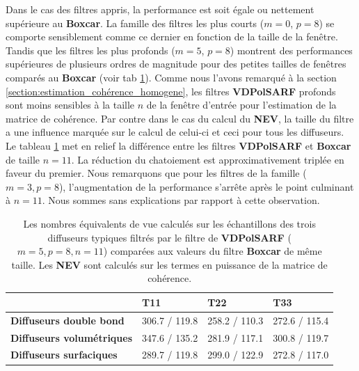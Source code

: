 Dans le cas des filtres appris, la performance est soit égale ou nettement supérieure au \textbf{Boxcar}. La famille des filtres les plus courts ($m=0$, $p=8$) se comporte sensiblement comme ce dernier en fonction de la taille de la fenêtre. Tandis que les filtres les plus profonds ($m=5$, $p=8$) montrent des performances supérieures de plusieurs ordres de magnitude pour des petites tailles de fenêtres comparés au \textbf{Boxcar} (voir tab \ref{tab:vdpolsarf_lee_nev}).  Comme nous l'avons remarqué à la section \ref{section:estimation_cohérence_homogene}, les filtres \textbf{VDPolSARF} profonds sont moins sensibles à la taille $n$ de la fenêtre d'entrée pour l'estimation de la matrice de cohérence.  Par contre dans le cas du calcul du \textbf{NEV}, la taille du filtre a une influence marquée sur le calcul de celui-ci et ceci pour tous les diffuseurs.  Le tableau \ref{tab:vdpolsarf_lee_nev} met en relief la différence entre les filtres \textbf{VDPolSARF} et \textbf{Boxcar} de taille $n=11$.  La réduction du chatoiement est approximativement triplée en faveur du premier. Nous remarquons que pour les filtres de la famille ($m=3, p=8$), l'augmentation de la performance s'arrête après le point culminant à $n=11$.  Nous sommes sans explications par rapport à cette observation.


\begin{table}[!htbp]
\centering
\begin{tabular}{|l|l|l|l|}
\hline
                     & \textbf{T11} & \textbf{T22} & \textbf{T33} \\ \hline
\textbf{Diffuseurs double bond} & 306.7 / 119.8      & 258.2 / 110.3        & 272.6 / 115.4        \\ \hline 
\textbf{Diffuseurs volumétriques}      & 347.6  / 135.2         & 281.9  / 117.1       & 300.8 / 119.7        \\ \hline
\textbf{Diffuseurs surfaciques}     & 289.7 / 119.8        & 299.0 / 122.9        & 272.8 / 117.0     \\ \hline  
\end{tabular}
\caption{\small{Les nombres équivalents de vue calculés sur les échantillons des trois diffuseurs typiques filtrés par le filtre de \textbf{VDPolSARF} ($m=5, p=8, n=11$) comparées aux valeurs du filtre \textbf{Boxcar} de même taille.  Les \textbf{NEV} sont calculés sur les termes en puissance de la matrice de cohérence. }
}
\label{tab:vdpolsarf_lee_nev}
\end{table}

